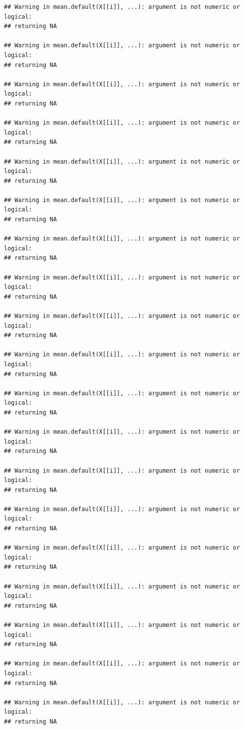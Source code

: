 \documentclass[]{gitbook}
\theoremstyle{definition}
\theoremstyle{definition}
\theoremstyle{definition}
\theoremstyle{remark}
\begin{document}
\begin{verbatim}
## Warning in mean.default(X[[i]], ...): argument is not numeric or logical:
## returning NA

## Warning in mean.default(X[[i]], ...): argument is not numeric or logical:
## returning NA

## Warning in mean.default(X[[i]], ...): argument is not numeric or logical:
## returning NA

## Warning in mean.default(X[[i]], ...): argument is not numeric or logical:
## returning NA

## Warning in mean.default(X[[i]], ...): argument is not numeric or logical:
## returning NA

## Warning in mean.default(X[[i]], ...): argument is not numeric or logical:
## returning NA

## Warning in mean.default(X[[i]], ...): argument is not numeric or logical:
## returning NA

## Warning in mean.default(X[[i]], ...): argument is not numeric or logical:
## returning NA

## Warning in mean.default(X[[i]], ...): argument is not numeric or logical:
## returning NA

## Warning in mean.default(X[[i]], ...): argument is not numeric or logical:
## returning NA

## Warning in mean.default(X[[i]], ...): argument is not numeric or logical:
## returning NA

## Warning in mean.default(X[[i]], ...): argument is not numeric or logical:
## returning NA

## Warning in mean.default(X[[i]], ...): argument is not numeric or logical:
## returning NA

## Warning in mean.default(X[[i]], ...): argument is not numeric or logical:
## returning NA

## Warning in mean.default(X[[i]], ...): argument is not numeric or logical:
## returning NA

## Warning in mean.default(X[[i]], ...): argument is not numeric or logical:
## returning NA

## Warning in mean.default(X[[i]], ...): argument is not numeric or logical:
## returning NA

## Warning in mean.default(X[[i]], ...): argument is not numeric or logical:
## returning NA

## Warning in mean.default(X[[i]], ...): argument is not numeric or logical:
## returning NA


\end{verbatim}
\end{document}
